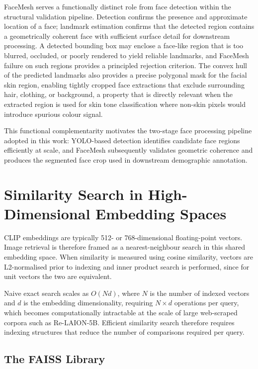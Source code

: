FaceMesh serves a functionally distinct role from face detection within the structural
validation pipeline. Detection confirms the presence and approximate location of a face; landmark estimation
confirms that the detected region contains a geometrically coherent face with sufficient
surface detail for downstream processing. A detected bounding box may enclose a face-like region that is too blurred, occluded, or
poorly rendered to yield reliable landmarks, and FaceMesh failure on such regions provides a principled rejection criterion.
The convex hull of the predicted landmarks also provides a precise polygonal mask for the
facial skin region, enabling tightly cropped face extractions that exclude surrounding
hair, clothing, or background, a property that is directly relevant when the extracted
region is used for skin tone classification where non-skin pixels would introduce spurious
colour signal.

This functional complementarity motivates the two-stage face processing pipeline adopted
in this work: YOLO-based detection identifies candidate face regions efficiently
at scale, and FaceMesh subsequently validates geometric coherence and produces the
segmented face crop used in downstream demographic annotation.

\section{Similarity Search in High-Dimensional Embedding Spaces} \label{sec:similarity_search}\label{sec:faiss}

CLIP embeddings \cite{Radford_2021_CLIP} are typically 512- or 768-dimensional floating-point vectors. Image retrieval is therefore framed as a nearest-neighbour search in this shared embedding space. When similarity is measured using cosine similarity, vectors are L2-normalised prior to indexing and inner product search is performed, since for unit vectors the two are equivalent.

Naive exact search scales as $O(Nd)$, where $N$ is the number of indexed vectors and
$d$ is the embedding dimensionality, requiring $N \times d$ operations per query, which
becomes computationally intractable at the scale of large web-scraped corpora such as
Re-LAION-5B. Efficient similarity search therefore requires indexing structures that
reduce the number of comparisons required per query.

\subsection*{The FAISS Library}
\label{subsec:faiss_library}

